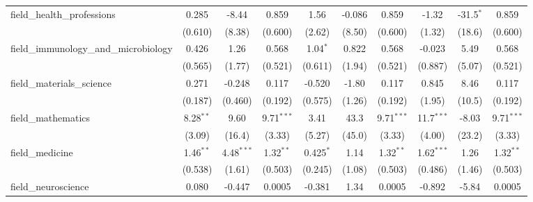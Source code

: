 \begin{tabular}{lccccccccc}
   field\_health\_professions                                  & 0.285          & -8.44          & 0.859          & 1.56           & -0.086        & 0.859          & -1.32          & -31.5$^{*}$    & 0.859\\   
                                                               & (0.610)        & (8.38)         & (0.600)        & (2.62)         & (8.50)        & (0.600)        & (1.32)         & (18.6)         & (0.600)\\   
   field\_immunology\_and\_microbiology                        & 0.426          & 1.26           & 0.568          & 1.04$^{*}$     & 0.822         & 0.568          & -0.023         & 5.49           & 0.568\\   
                                                               & (0.565)        & (1.77)         & (0.521)        & (0.611)        & (1.94)        & (0.521)        & (0.887)        & (5.07)         & (0.521)\\   
   field\_materials\_science                                   & 0.271          & -0.248         & 0.117          & -0.520         & -1.80         & 0.117          & 0.845          & 8.46           & 0.117\\   
                                                               & (0.187)        & (0.460)        & (0.192)        & (0.575)        & (1.26)        & (0.192)        & (1.95)         & (10.5)         & (0.192)\\   
   field\_mathematics                                          & 8.28$^{**}$    & 9.60           & 9.71$^{***}$   & 3.41           & 43.3          & 9.71$^{***}$   & 11.7$^{***}$   & -8.03          & 9.71$^{***}$\\   
                                                               & (3.09)         & (16.4)         & (3.33)         & (5.27)         & (45.0)        & (3.33)         & (4.00)         & (23.2)         & (3.33)\\   
   field\_medicine                                             & 1.46$^{**}$    & 4.48$^{***}$   & 1.32$^{**}$    & 0.425$^{*}$    & 1.14          & 1.32$^{**}$    & 1.62$^{***}$   & 1.26           & 1.32$^{**}$\\   
                                                               & (0.538)        & (1.61)         & (0.503)        & (0.245)        & (1.08)        & (0.503)        & (0.486)        & (1.46)         & (0.503)\\   
   field\_neuroscience                                         & 0.080          & -0.447         & 0.0005         & -0.381         & 1.34          & 0.0005         & -0.892         & -5.84          & 0.0005\\   

\end{tabular}
